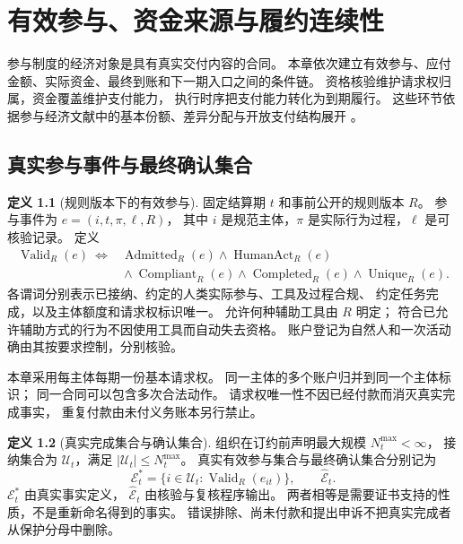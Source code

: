 \documentclass[UTF8,12pt,a4paper,openany,fontset=none,zihao=false]{ctexrep}
\theoremstyle{definition}
\newtheorem{definition}{定义}[chapter]
\newcommand{\1}{\mathbf 1}
\begin{document}
\chapter{有效参与、资金来源与履约连续性}
\label{part:chapter}

参与制度的经济对象是具有真实交付内容的合同。
本章依次建立有效参与、应付金额、实际资金、最终到账和下一期入口之间的条件链。
资格核验维护请求权归属，资金覆盖维护支付能力，
执行时序把支付能力转化为到期履行。
这些环节依据参与经济文献中的基本份额、差异分配与开放支付结构展开
\cite{InternalEconomics}。

\section{真实参与事件与最终确认集合}

\begin{definition}[规则版本下的有效参与]
\label{part:def-valid}
固定结算期 \(t\) 和事前公开的规则版本 \(R\)。
参与事件为 \(e=(i,t,\pi,\ell,R)\)，
其中 \(i\) 是规范主体，\(\pi\) 是实际行为过程，\(\ell\) 是可核验记录。
定义
\[
\begin{aligned}
 \operatorname{Valid}_R(e)\ \Longleftrightarrow{}&
 \operatorname{Admitted}_R(e)\land\operatorname{HumanAct}_R(e)\\
 &{}\land\operatorname{Compliant}_R(e)
 \land\operatorname{Completed}_R(e)
 \land\operatorname{Unique}_R(e).
\end{aligned}
\]
各谓词分别表示已接纳、约定的人类实际参与、工具及过程合规、
约定任务完成，以及主体额度和请求权标识唯一。
允许何种辅助工具由 \(R\) 明定；
符合已允许辅助方式的行为不因使用工具而自动失去资格。
账户登记为自然人和一次活动确由其按要求控制，分别核验。

本章采用每主体每期一份基本请求权。
同一主体的多个账户归并到同一个主体标识；
同一合同可以包含多次合法动作。
请求权唯一性不因已经付款而消灭真实完成事实，
重复付款由未付义务账本另行禁止。
\end{definition}

\begin{definition}[真实完成集合与确认集合]
\label{part:def-eligible-set}
组织在订约前声明最大规模 \(N_t^{\max}<\infty\)，
接纳集合为 \(\mathcal U_t\)，满足
\(|\mathcal U_t|\le N_t^{\max}\)。
真实有效参与集合与最终确认集合分别记为
\[
 \mathcal E_t^\ast
 =\{i\in\mathcal U_t:\operatorname{Valid}_R(e_{it})\},
 \qquad
 \widehat{\mathcal E}_t.
\]
\(\mathcal E_t^\ast\) 由真实事实定义，
\(\widehat{\mathcal E}_t\) 由核验与复核程序输出。
两者相等是需要证书支持的性质，不是重新命名得到的事实。
错误排除、尚未付款和提出申诉不把真实完成者从保护分母中删除。
\end{definition}
\end{document}
